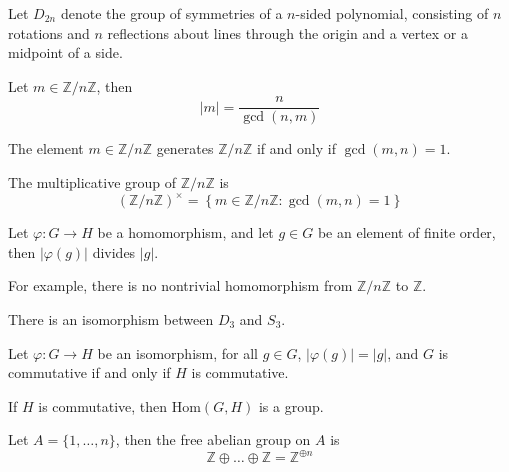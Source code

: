 \documentclass[openany]{book}
\newcommand{\Z}{\mathbb{Z}}
\begin{document}
\begin{defn}
    Let $D_{2n}$ denote the group of symmetries of a $n$-sided polynomial, consisting of $n$ rotations and $n$ reflections about lines through the origin and a vertex or a midpoint of a side.
\end{defn}

\begin{prop}
    Let $m\in\Z/n\Z$, then 
    \begin{equation*}
        |m|=\frac{n}{\gcd(n,m)}
    \end{equation*} 
\end{prop}

\begin{cor}
    The element $m\in\Z/n\Z$ generates $\Z/n\Z$ if and only if $\gcd(m,n)=1$.
\end{cor}


\begin{defn}[Multiplicative $(\Z/n\Z)^\times$]
    The multiplicative group of $\Z/n\Z$ is 
    \begin{equation*}
        \left(\Z/n\Z\right)^\times=\left\{m\in\Z/n\Z: \gcd(m,n)=1\right\}
    \end{equation*}
\end{defn}

\begin{prop}
    Let $\varphi:G\to H$ be a homomorphism, and let $g\in G$ be an element of finite order, then $|\varphi(g)|$ divides $|g|$.

    For example, there is no nontrivial homomorphism from $\Z/n\Z$ to $\Z$.
\end{prop}

\begin{prop}
    There is an isomorphism between $D_3$ and $S_3$.
\end{prop}

\begin{prop}
    Let $\varphi: G\to H$ be an isomorphism, for all $g\in G$, $|\varphi(g)|=|g|$, and $G$ is commutative if and only if $H$ is commutative.
\end{prop}

\begin{prop}
    If $H$ is commutative, then $\text{Hom}(G,H) $ is a group.
\end{prop}

\begin{defn}
    Let $A=\{1,\dots, n\}$, then the free abelian group on $A$ is 
    \begin{equation*}
        \Z\oplus\dots\oplus\Z=\Z^{\oplus n}
    \end{equation*}
\end{defn}
\end{document}
